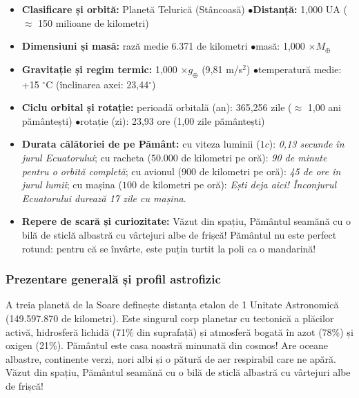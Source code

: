 \begin{tcolorbox}[orbitardata, title={\textbf{Repere esențiale: Pământul}}]
\small
\begin{itemize}[leftmargin=1.4em, itemsep=2pt, topsep=2pt]
  \item \textbf{Clasificare și orbită:} Planetă Telurică (Stâncoasă) \quad$\bullet$\quad \textbf{Distanță:} 1,000 UA ($\approx$ 150 milioane de kilometri)
  \item \textbf{Dimensiuni și masă:} rază medie 6.371 de kilometri \quad$\bullet$\quad masă: 1,000 $\times M_\oplus$
  \item \textbf{Gravitație și regim termic:} 1,000 $\times g_\oplus$ (9,81 m/s$^2$) \quad$\bullet$\quad temperatură medie: +15 $^\circ$C (înclinarea axei: 23,44$^\circ$)
  \item \textbf{Ciclu orbital și rotație:} perioadă orbitală (an): 365,256 zile ($\approx$ 1,00 ani pământești) \quad$\bullet$\quad rotație (zi): 23,93 ore (1,00 zile pământești)
  \item \textbf{Durata călătoriei de pe Pământ:} cu viteza luminii ($1c$): \emph{0,13 secunde în jurul Ecuatorului}; cu racheta ($50.000$ de kilometri pe oră): \emph{90 de minute pentru o orbită completă}; cu avionul ($900$ de kilometri pe oră): \emph{45 de ore în jurul lumii}; cu mașina ($100$ de kilometri pe oră): \emph{Ești deja aici! Înconjurul Ecuatorului durează 17 zile cu mașina}.
  \item \textbf{Repere de scară și curiozitate:} Văzut din spațiu, Pământul seamănă cu o bilă de sticlă albastră cu vârtejuri albe de frișcă! Pământul nu este perfect rotund: pentru că se învârte, este puțin turtit la poli ca o mandarină!
\end{itemize}
\end{tcolorbox}

\subsubsection*{Prezentare generală și profil astrofizic}
A treia planetă de la Soare definește distanța etalon de 1 Unitate Astronomică (149.597.870 de kilometri). Este singurul corp planetar cu tectonică a plăcilor activă, hidrosferă lichidă (71\% din suprafață) și atmosferă bogată în azot (78\%) și oxigen (21\%). Pământul este casa noastră minunată din cosmos! Are oceane albastre, continente verzi, nori albi și o pătură de aer respirabil care ne apără. Văzut din spațiu, Pământul seamănă cu o bilă de sticlă albastră cu vârtejuri albe de frișcă!

